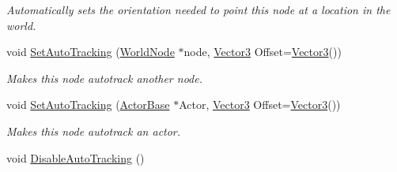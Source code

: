 \begin{DoxyCompactItemize}
\begin{DoxyCompactList}\small\item\em Automatically sets the orientation needed to point this node at a location in the world. \item\end{DoxyCompactList}\item 
void \hyperlink{classphys_1_1WorldNode_a3c8447cd6de0af06a6004cdd968671f0}{SetAutoTracking} (\hyperlink{classphys_1_1WorldNode}{WorldNode} $\ast$node, \hyperlink{classphys_1_1Vector3}{Vector3} Offset=\hyperlink{classphys_1_1Vector3}{Vector3}())
\begin{DoxyCompactList}\small\item\em Makes this node autotrack another node. \item\end{DoxyCompactList}\item 
void \hyperlink{classphys_1_1WorldNode_a3bd06b9d4a4baa6937a8a3a33a33b047}{SetAutoTracking} (\hyperlink{classphys_1_1ActorBase}{ActorBase} $\ast$Actor, \hyperlink{classphys_1_1Vector3}{Vector3} Offset=\hyperlink{classphys_1_1Vector3}{Vector3}())
\begin{DoxyCompactList}\small\item\em Makes this node autotrack an actor. \item\end{DoxyCompactList}\item 
\hypertarget{classphys_1_1WorldNode_aec20d9b24a8de76a227307a9d287d127}{
void \hyperlink{classphys_1_1WorldNode_aec20d9b24a8de76a227307a9d287d127}{DisableAutoTracking} ()}
\label{d2/d3e/classphys_1_1WorldNode_aec20d9b24a8de76a227307a9d287d127}


\end{DoxyCompactItemize}
